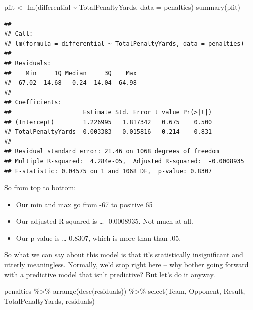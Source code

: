 \documentclass[
]{book}
\newenvironment{Shaded}{\begin{snugshade}}{\end{snugshade}}
\newcommand{\AttributeTok}[1]{\textcolor[rgb]{0.77,0.63,0.00}{#1}}
\newcommand{\FunctionTok}[1]{\textcolor[rgb]{0.00,0.00,0.00}{#1}}
\newcommand{\NormalTok}[1]{#1}
\newcommand{\OtherTok}[1]{\textcolor[rgb]{0.56,0.35,0.01}{#1}}
\newcommand{\SpecialCharTok}[1]{\textcolor[rgb]{0.00,0.00,0.00}{#1}}
\providecommand{\tightlist}{%
  \setlength{\itemsep}{0pt}\setlength{\parskip}{0pt}}
\begin{document}
\begin{Shaded}
\begin{Highlighting}[]
\NormalTok{pfit }\OtherTok{\textless{}{-}} \FunctionTok{lm}\NormalTok{(differential }\SpecialCharTok{\textasciitilde{}}\NormalTok{ TotalPenaltyYards, }\AttributeTok{data =}\NormalTok{ penalties)}
\FunctionTok{summary}\NormalTok{(pfit)}
\end{Highlighting}
\end{Shaded}

\begin{verbatim}
## 
## Call:
## lm(formula = differential ~ TotalPenaltyYards, data = penalties)
## 
## Residuals:
##    Min     1Q Median     3Q    Max 
## -67.02 -14.68   0.24  14.04  64.98 
## 
## Coefficients:
##                    Estimate Std. Error t value Pr(>|t|)
## (Intercept)        1.226995   1.817342   0.675    0.500
## TotalPenaltyYards -0.003383   0.015816  -0.214    0.831
## 
## Residual standard error: 21.46 on 1068 degrees of freedom
## Multiple R-squared:  4.284e-05,  Adjusted R-squared:  -0.0008935 
## F-statistic: 0.04575 on 1 and 1068 DF,  p-value: 0.8307
\end{verbatim}

So from top to bottom:

\begin{itemize}
\tightlist
\item
  Our min and max go from -67 to positive 65
\item
  Our adjusted R-squared is \ldots{} -0.0008935. Not much at all.
\item
  Our p-value is \ldots{} 0.8307, which is more than than .05.
\end{itemize}

So what we can say about this model is that it's statistically insignificant and utterly meaningless. Normally, we'd stop right here -- why bother going forward with a predictive model that isn't predictive? But let's do it anyway.

\begin{Shaded}
\end{Shaded}

\begin{Shaded}
\begin{Highlighting}[]
\NormalTok{penalties }\SpecialCharTok{\%\textgreater{}\%} \FunctionTok{arrange}\NormalTok{(}\FunctionTok{desc}\NormalTok{(residuals)) }\SpecialCharTok{\%\textgreater{}\%} \FunctionTok{select}\NormalTok{(Team, Opponent, Result, TotalPenaltyYards, residuals)}
\end{Highlighting}
\end{Shaded}
\end{document}
